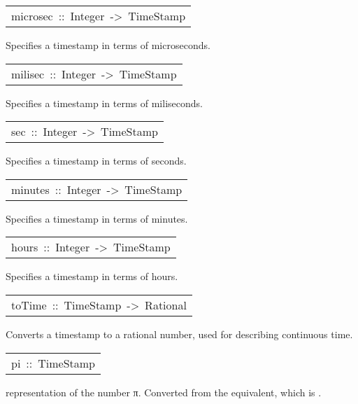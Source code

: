 \begin{haddockdesc}
\item[\begin{tabular}{@{}l}
microsec\ ::\ Integer\ ->\ TimeStamp
\end{tabular}]\haddockbegindoc
Specifies a timestamp in terms of microseconds.\par

\end{haddockdesc}
\begin{haddockdesc}
\item[\begin{tabular}{@{}l}
milisec\ ::\ Integer\ ->\ TimeStamp
\end{tabular}]\haddockbegindoc
Specifies a timestamp in terms of miliseconds.\par

\end{haddockdesc}
\begin{haddockdesc}
\item[\begin{tabular}{@{}l}
sec\ ::\ Integer\ ->\ TimeStamp
\end{tabular}]\haddockbegindoc
Specifies a timestamp in terms of seconds.\par

\end{haddockdesc}
\begin{haddockdesc}
\item[\begin{tabular}{@{}l}
minutes\ ::\ Integer\ ->\ TimeStamp
\end{tabular}]\haddockbegindoc
Specifies a timestamp in terms of minutes.\par

\end{haddockdesc}
\begin{haddockdesc}
\item[\begin{tabular}{@{}l}
hours\ ::\ Integer\ ->\ TimeStamp
\end{tabular}]\haddockbegindoc
Specifies a timestamp in terms of hours.\par

\end{haddockdesc}
\begin{haddockdesc}
\item[\begin{tabular}{@{}l}
toTime\ ::\ TimeStamp\ ->\ Rational
\end{tabular}]\haddockbegindoc
Converts a timestamp to a rational number, used for describing
 continuous time.\par

\end{haddockdesc}
\begin{haddockdesc}
\item[\begin{tabular}{@{}l}
pi\ ::\ TimeStamp
\end{tabular}]\haddockbegindoc
{} representation of the number π. Converted from
 the  equivalent, which is .\par

\end{haddockdesc}